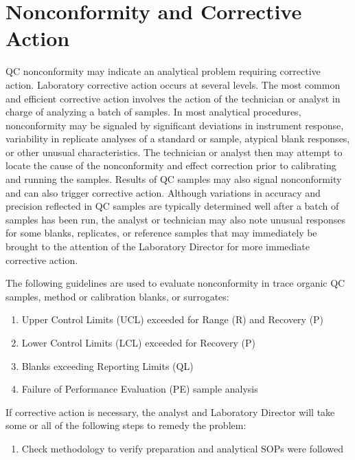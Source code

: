 \section{Nonconformity and Corrective Action}
QC nonconformity may indicate an analytical problem requiring corrective 
action. Laboratory corrective action occurs at several levels. The most 
common and efficient corrective action involves the action of the 
technician or analyst in charge of analyzing a batch of samples. In most 
analytical procedures, nonconformity may be signaled by significant 
deviations in instrument response, variability in replicate analyses of 
a standard or sample, atypical blank responses, or other unusual 
characteristics. The technician or analyst then may attempt to locate 
the cause of the nonconformity and effect correction prior to 
calibrating and running the samples. Results of QC samples may also 
signal nonconformity and can also trigger corrective action. Although 
variations in accuracy and precision reflected in QC samples are 
typically determined well after a batch of samples has been run, the 
analyst or technician may also note unusual responses for some blanks, 
replicates, or reference samples that may immediately be brought to the 
attention of the Laboratory Director for more immediate corrective 
action. 

\noindent
The following guidelines are used to evaluate nonconformity in trace 
organic QC samples, method or calibration blanks, or surrogates: 

\begin{enumerate}
	\item Upper Control Limits (UCL) exceeded for Range (R) and Recovery (P) 
	\item Lower Control Limits (LCL) exceeded for Recovery (P)
	\item Blanks exceeding Reporting Limits (QL)
	\item Failure of Performance Evaluation (PE) sample analysis
\end{enumerate}

\noindent
 If corrective action is necessary, the analyst and Laboratory 
Director will take some or all of the following steps to remedy the 
problem:

\begin{enumerate}
	\item Check methodology to verify preparation and analytical SOPs were followed
\setcounter{numberedCntB}{\theenumi}
\end{enumerate}


